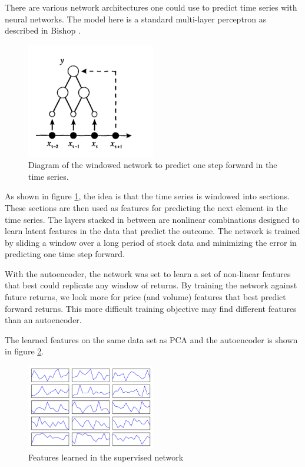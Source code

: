 \documentclass{article}
\begin{document}
There are various network architectures one could use to predict time
series with neural networks. The model here is a standard multi-layer
perceptron as described in Bishop \cite{bishop1995neural}.

\begin{figure}[h]
	\centering
    \includegraphics[width=0.5\textwidth]{bishop_ts_nn}
    \caption{Diagram of the windowed network to predict one step forward in the
    time series.}
    \label{fig:mlp_ts}
\end{figure}

As shown in figure \ref{fig:mlp_ts}, the idea is that the time series is windowed
into sections. These sections are then used as features for predicting the next
element in the time series. The layers stacked in between are nonlinear
combinations designed to learn latent features in the data that predict the
outcome. The network is trained by sliding a window over a long period of stock
data and minimizing the error in predicting one time step forward.

With the autoencoder, the network was set to learn a set of non-linear features
that best could replicate any window of returns. By training the network 
against future returns, we look more for price (and volume)
features that best predict forward returns. This more difficult training
objective may find different features than an autoencoder. 

The learned features on the same data set as PCA and the autoencoder is shown in
figure \ref{fig:mlp_feats}.

\begin{figure}[h]
	\centering
    \includegraphics[width=0.5\textwidth]{mlp_feats}
    \caption{Features learned in the supervised network}
    \label{fig:mlp_feats}
\end{figure}
\end{document}
